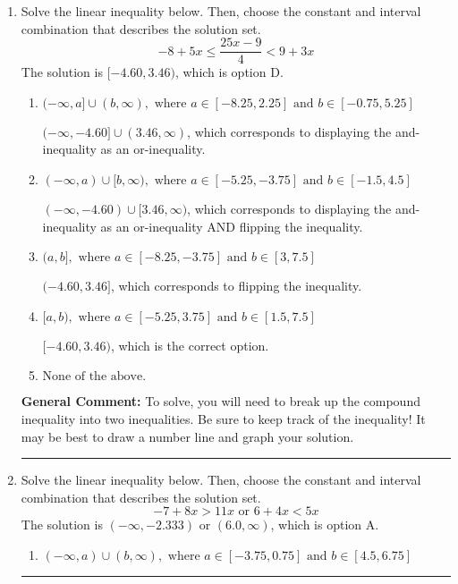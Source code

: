 \documentclass{extbook}[14pt]
\newcommand{\litem}[1]{\item #1

\rule{\textwidth}{0.4pt}}
\begin{document}
\begin{enumerate}
{\begin{enumerate}[label=\Alph*.]
Corresponds to including the endpoints (when they should be excluded).
\item \( (-\infty, \infty) \)

Corresponds to the variable canceling, which does not happen in this instance.
\end{enumerate}

\textbf{General Comment:} When multiplying or dividing by a negative, flip the sign.
}
\litem{
Solve the linear inequality below. Then, choose the constant and interval combination that describes the solution set.
\[ -8 + 5 x \leq \frac{25 x - 9}{4} < 9 + 3 x \]The solution is \( [-4.60, 3.46) \), which is option D.\begin{enumerate}[label=\Alph*.]
\item \( (-\infty, a] \cup (b, \infty), \text{ where } a \in [-8.25, 2.25] \text{ and } b \in [-0.75, 5.25] \)

$(-\infty, -4.60] \cup (3.46, \infty)$, which corresponds to displaying the and-inequality as an or-inequality.
\item \( (-\infty, a) \cup [b, \infty), \text{ where } a \in [-5.25, -3.75] \text{ and } b \in [-1.5, 4.5] \)

$(-\infty, -4.60) \cup [3.46, \infty)$, which corresponds to displaying the and-inequality as an or-inequality AND flipping the inequality.
\item \( (a, b], \text{ where } a \in [-8.25, -3.75] \text{ and } b \in [3, 7.5] \)

$(-4.60, 3.46]$, which corresponds to flipping the inequality.
\item \( [a, b), \text{ where } a \in [-5.25, 3.75] \text{ and } b \in [1.5, 7.5] \)

$[-4.60, 3.46)$, which is the correct option.
\item \( \text{None of the above.} \)


\end{enumerate}

\textbf{General Comment:} To solve, you will need to break up the compound inequality into two inequalities. Be sure to keep track of the inequality! It may be best to draw a number line and graph your solution.
}
\litem{
Solve the linear inequality below. Then, choose the constant and interval combination that describes the solution set.
\[ -7 + 8 x > 11 x \text{ or } 6 + 4 x < 5 x \]The solution is \( (-\infty, -2.333) \text{ or } (6.0, \infty) \), which is option A.\begin{enumerate}[label=\Alph*.]
\item \( (-\infty, a) \cup (b, \infty), \text{ where } a \in [-3.75, 0.75] \text{ and } b \in [4.5, 6.75] \)


\end{enumerate}}
\end{enumerate}
\end{document}

